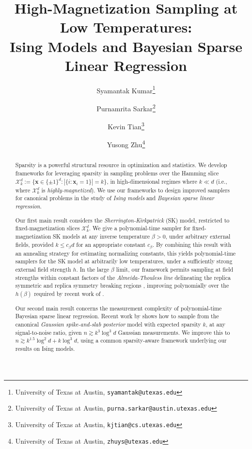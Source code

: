 \documentclass[11pt]{article}
\title{High-Magnetization Sampling at Low Temperatures: \\ Ising Models and Bayesian Sparse Linear Regression}
\date{}
\author{Syamantak Kumar\thanks{University of Texas at Austin, \texttt{syamantak@utexas.edu}} \and Purnamrita Sarkar\thanks{University of Texas at Austin, \texttt{purna.sarkar@austin.utexas.edu}} \and Kevin Tian\thanks{University of Texas at Austin, \texttt{kjtian@cs.utexas.edu}} \and Yusong Zhu\thanks{University of Texas at Austin, \texttt{zhuys@utexas.edu}}}
\newcommand{\defeq}{:=}
\newcommand{\1}{\mathbf{1}}
\newcommand{\0}{\mathbf{0}}
\newcommand{\vx}{{\mathbf{x}}}
\newcommand{\calX}{{\mathcal{X}}}
\begin{document}
\allowdisplaybreaks
{}
\maketitle

\begin{abstract}
Sparsity is a powerful structural resource in optimization and statistics.
We develop frameworks for leveraging sparsity in sampling problems over the Hamming slice $\calX^d_k \defeq \{\vx \in \{\pm 1\}^d: |\{i: \vx_i = 1\}| = k\}$, in high-dimensional regimes where $k \ll d$ (i.e., where $\calX^d_k$ is \emph{highly-magnetized}). We use our frameworks to design improved samplers for canonical problems in the study of \emph{Ising models} and \emph{Bayesian sparse linear regression}.

Our first main result considers the \emph{Sherrington-Kirkpatrick} (SK) model, restricted to fixed-magnetization slices $\calX^d_k$. We give a polynomial-time sampler for fixed-magnetization SK models at any inverse temperature $\beta > 0$, under arbitrary external fields, provided $k \le c_\beta d$ for an appropriate constant $c_\beta$. By combining this result with an annealing strategy for estimating normalizing constants, this yields polynomial-time samplers for the SK model at arbitrarily low temperatures, under a sufficiently strong external field strength $h$. In the large $\beta$ limit, our framework permits sampling at field strengths within constant factors of the \emph{Almeida-Thouless line} delineating the replica symmetric and replica symmetry breaking regions \cite{deAlmeidaThouless78}, improving polynomially over the $h(\beta)$ required by recent work of \cite{BandeiraElAlaouiRodder26}. 

Our second main result concerns the measurement complexity of polynomial-time Bayesian sparse linear regression. Recent work by \cite{KumarSTZ25} shows how to sample from the canonical \emph{Gaussian spike-and-slab posterior} model with expected sparsity $k$, at any signal-to-noise ratio, given $n \gtrsim k^3 \log^3 d$ Gaussian measurements. We improve this to $n \gtrsim k^{1.5} \log^2 d + k\log^3 d$, using a common sparsity-aware framework underlying our results on Ising models.
\end{abstract}
\thispagestyle{empty}
\newpage
\tableofcontents
\thispagestyle{empty}
\newpage

\end{document}

